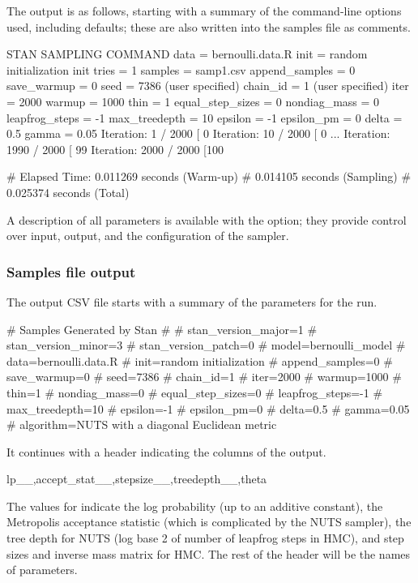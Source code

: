 \documentclass[article]{jss}
\begin{document}
The output is as follows, starting with a summary of the command-line
options used, including defaults;  these are also written into the 
samples file as comments.
%
\begin{Code}
STAN SAMPLING COMMAND
data = bernoulli.data.R
init = random initialization
init tries = 1
samples = samp1.csv
append_samples = 0
save_warmup = 0
seed = 7386 (user specified)
chain_id = 1 (user specified)
iter = 2000
warmup = 1000
thin = 1
equal_step_sizes = 0
nondiag_mass = 0
leapfrog_steps = -1
max_treedepth = 10
epsilon = -1
epsilon_pm = 0
delta = 0.5
gamma = 0.05
Iteration:    1 / 2000 [  0%
Iteration:   10 / 2000 [  0%
...
Iteration: 1990 / 2000 [ 99%
Iteration: 2000 / 2000 [100%

# Elapsed Time: 0.011269 seconds (Warm-up)
#               0.014105 seconds (Sampling)
#               0.025374 seconds (Total)
\end{Code}
%
A description of all parameters is available with the 
option; they provide control over input, output, and the configuration
of the sampler.

\subsubsection{Samples file output}

The output CSV file starts with a summary of the parameters for the
run.  
%
\begin{Code}
# Samples Generated by Stan
#
# stan_version_major=1
# stan_version_minor=3
# stan_version_patch=0
# model=bernoulli_model
# data=bernoulli.data.R
# init=random initialization
# append_samples=0
# save_warmup=0
# seed=7386
# chain_id=1
# iter=2000
# warmup=1000
# thin=1
# nondiag_mass=0
# equal_step_sizes=0
# leapfrog_steps=-1
# max_treedepth=10
# epsilon=-1
# epsilon_pm=0
# delta=0.5
# gamma=0.05
# algorithm=NUTS with a diagonal Euclidean metric
\end{Code}
%
It continues with a header indicating the columns of the output.
%
\begin{Code}
lp__,accept_stat__,stepsize__,treedepth__,theta
\end{Code}
%
The values for  indicate the log probability (up to an
additive constant), the Metropolis acceptance statistic (which is
complicated by the NUTS sampler), the tree depth for NUTS (log base 2
of number of leapfrog steps in HMC), and step sizes and inverse mass
matrix for HMC.  The rest of the header will be the names of parameters.
\end{document}

